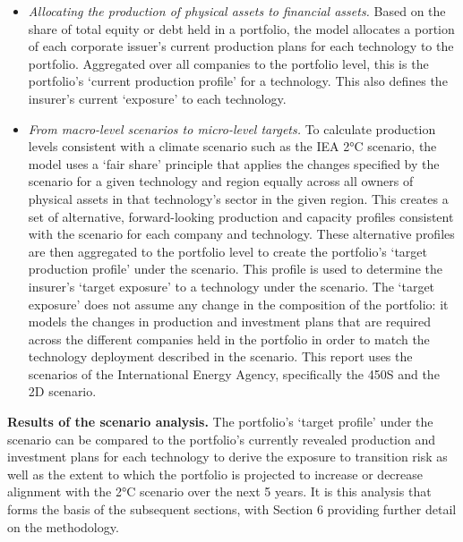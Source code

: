 \documentclass[10pt,table,a4]{article}\usepackage[]{graphicx}\usepackage[]{color}
\begin{document}
\begin{multicols}{2}
\begin{itemize}
			\item{\textit{Allocating the production of physical assets to financial assets.} Based on the share of total equity or debt held in a portfolio, the model allocates a portion of each corporate issuer's current production plans for each technology to the portfolio. Aggregated over all companies to the portfolio level, this is the portfolio's `current production profile' for a technology. This also defines the insurer's current `exposure' to each technology.}
			
			\item{\textit{From macro-level scenarios to micro-level targets. }To calculate production levels consistent with a climate scenario such as the IEA 2°C scenario, the model uses a `fair share' principle that applies the changes specified by the scenario for a given technology and region equally across all owners of physical assets in that technology's sector in the given region. This creates a set of alternative, forward-looking production and capacity profiles consistent with the scenario for each company and technology. These alternative profiles are then aggregated to the portfolio level to create the portfolio's `target production profile' under the scenario. This profile is used to determine the insurer's `target exposure' to a technology under the scenario. The `target exposure' does not assume any change in the composition of the portfolio: it models the changes in production and investment plans that are required across the different companies held in the portfolio in order to match the technology deployment described in the scenario. This report uses the scenarios of the International Energy Agency, specifically the 450S and the 2D scenario.} 
			
		\end{itemize}
		
		\textbf{Results of the scenario analysis.} The portfolio's `target profile' under the scenario can be compared to the portfolio's currently revealed production and investment plans for each technology to derive the exposure to transition risk as well as the extent to which the portfolio is projected to increase or decrease alignment with the 2°C scenario over the next 5 years. It is this analysis that forms the basis of the subsequent sections, with Section 6 providing further detail on the methodology.	
		\newline
		
	\end{multicols}
	
\end{document}
